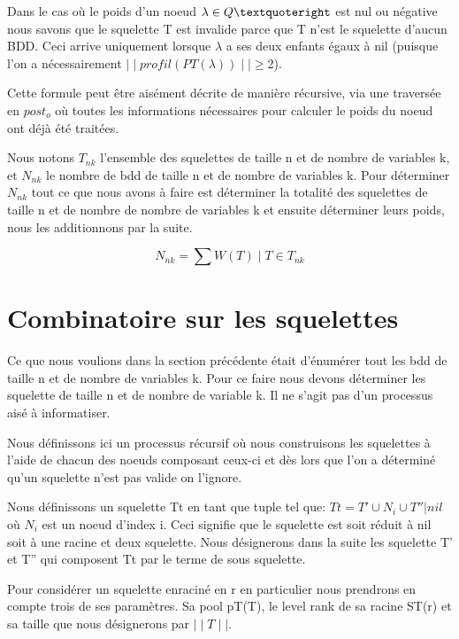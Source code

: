 \documentclass[french]{article}
\begin{document}
Dans le cas où le poids d'un noeud \(\lambda \in Q\textquoteright\) est nul ou négative nous savons que le squelette T est invalide parce que T n'est le squelette d'aucun BDD. Ceci arrive uniquement lorsque \(\lambda\) a ses deux enfants égaux à nil (puisque l'on a nécessairement \(\mid\mid profil(PT(\lambda)) \mid\mid \geq\)2).

Cette formule peut être aisément décrite de manière récursive, via une traversée en \(post_{o}\) où toutes les informations nécessaires pour calculer le poids du noeud ont déjà été traitées.
\vspace{5mm} 

Nous notons \(T_{nk}\) l'ensemble des squelettes de taille n et de nombre de variables k, et \(N_{nk}\) le nombre de bdd de taille n et de nombre de variables k.
Pour déterminer \(N_{nk}\) tout ce que nous avons à faire est déterminer la totalité des squelettes de taille n et de nombre de nombre de variables k et ensuite déterminer leurs poids, nous les additionnons par la suite.

\[N_{nk} = \sum W(T) \mid T \in T_{nk}\]

\section{Combinatoire sur les squelettes}
Ce que nous voulions dans la section précédente était d'énumérer tout les bdd de taille n et de nombre de variables k. Pour ce faire nous devons déterminer les squelette de taille n et de nombre de variable k. Il ne s'agit pas d'un processus aisé à informatiser.

Nous définissons ici un processus récursif où nous construisons les squelettes à l'aide de chacun des noeuds composant ceux-ci et dès lors que l'on a déterminé qu'un squelette n'est pas valide on l'ignore. 
\vspace{5mm} 

Nous définissons un squelette Tt en tant que tuple tel que:
$Tt=T' \cup N_i \cup T''| nil$ 
où \(N_i\) est un noeud d'index i. Ceci signifie que le squelette est soit réduit à nil soit à une racine et deux squelette. Nous désignerons dans la suite les squelette T' et T'' qui composent Tt par le terme de sous squelette.

Pour considérer un squelette enraciné en r en particulier nous prendrons en compte trois de ses paramètres. Sa pool pT(T), le level rank de sa racine ST(r) et sa taille que nous désignerons par \(\mid\mid T\mid\mid\).
\end{document}
